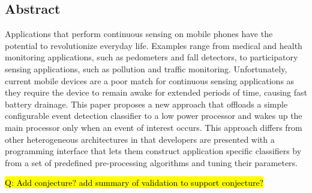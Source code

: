 \subsection*{Abstract}
 
  Applications that perform continuous sensing on mobile phones have
  the potential to revolutionize everyday life.  Examples range from
  medical and health monitoring applications, such as pedometers and
  fall detectors, to participatory sensing applications, such as
  pollution and traffic monitoring.  Unfortunately, current mobile
  devices are a poor match for continuous sensing applications as they
  require the device to remain awake for extended periods of time,
  causing fast battery drainage.  This paper proposes a new approach 
  that offloads a simple configurable event detection classifier to a low power
  processor and wakes up the main processor only when an event of
  interest occurs.  This approach differs from other heterogeneous
  architectures in that developers are presented with a programming
  interface that lets them construct application specific classifiers
  by from a set of predefined pre-processing algorithms and tuning their 
  parameters.  
  
  \hl{Q: Add conjecture? add summary of validation to support conjecture?}

